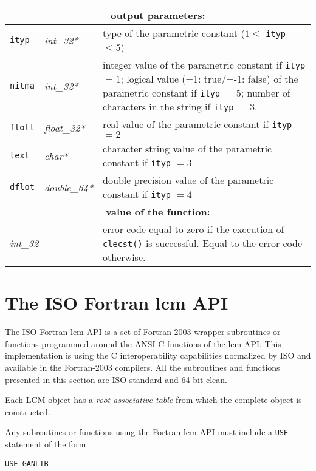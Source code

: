 \vskip 0.4cm

\noindent
\begin{tabular}{|p{1.5cm}|p{2cm}|p{11cm}|}
\hline
\multicolumn{3}{|c|}{\bf output parameters:} \\
\hline
{\tt ityp} & {\it int\_32*} & type of the parametric constant ($1 \le$ {\tt ityp} $ \le 5$) \\
\hline
{\tt nitma} & {\it int\_32*} & integer value of the parametric constant if {\tt ityp} $= 1$; logical value (=1: true/=-1: false) of the parametric constant if {\tt ityp} $= 5$;
number of characters in the string if {\tt ityp} $= 3$. \\
\hline
{\tt flott} & {\it float\_32*} & real value of the parametric constant if {\tt ityp} $= 2$ \\
\hline
{\tt text} & {\it char*} & character string value of the parametric constant if {\tt ityp} $= 3$ \\
\hline
{\tt dflot} & {\it double\_64*} & double precision value of the parametric constant if {\tt ityp} $= 4$ \\
\hline
\multicolumn{3}{|c|}{\bf value of the function:} \\
\hline
\multicolumn{2}{|l|}{{\it int\_32}} & error code equal to zero if the execution of {\tt clecst()} is successful. Equal to the error code otherwise. \\
\hline
\end{tabular}

\section {The ISO Fortran {\sc lcm} API}

The ISO Fortran {\sc lcm} API is a set of Fortran-2003 wrapper subroutines or functions programmed around the ANSI-C functions of the {\sc lcm} API. This implementation is using
the C interoperability capabilities normalized by ISO and available in the Fortran-2003 compilers. All the subroutines and functions presented in this section are ISO-standard and 64-bit clean.

\vskip 0.08cm

Each LCM object has a {\sl root associative table} from which the complete object is constructed.

\vskip 0.08cm

Any subroutines or functions using the Fortran {\sc lcm} API must include a {\tt USE} statement of the form
\begin{verbatim}
USE GANLIB
\end{verbatim}

